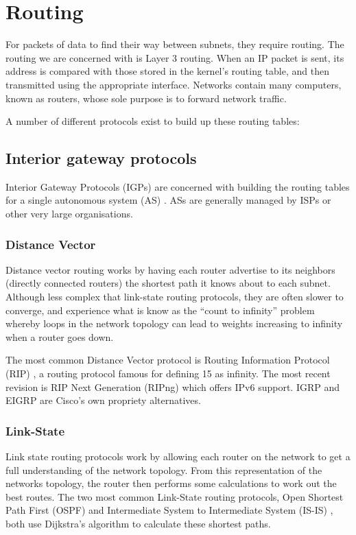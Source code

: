 \documentclass[12pt]{report}
\begin{document}
\section{Routing}
For packets of data to find their way between subnets, they require routing.
The routing we are concerned with is Layer 3 routing. When an IP packet is
sent, its address is compared with those stored in the kernel's routing table,
and then transmitted using the appropriate interface. Networks contain many
computers, known as routers,  whose sole purpose is to forward network traffic.

A number of different protocols exist to build up these routing tables:

\subsection{Interior gateway protocols}
Interior Gateway Protocols (IGPs)  are concerned with building the routing tables for a single
autonomous system (AS) . ASs are generally
managed by ISPs or other very large organisations.  

\subsubsection{Distance Vector}
Distance vector routing works by having each router advertise to its neighbors
(directly connected routers) the shortest path it knows about to each subnet.
Although less complex that link-state routing protocols, they are often slower
to converge, and experience what is know as the ``count to infinity'' problem
whereby loops in the network topology can lead to weights increasing to
infinity when a router goes down. 

The most common Distance Vector protocol is Routing Information Protocol (RIP)
, a routing protocol famous for
defining 15 as infinity. The most recent revision is RIP Next Generation
(RIPng) which offers IPv6 support. IGRP and EIGRP are Cisco's own propriety
alternatives.

\subsubsection{Link-State}
Link state routing protocols work by allowing each router on the network to get
a full understanding of the network topology. From this representation of the
networks topology, the router then performs some calculations to work out the
best routes. The two most common Link-State routing protocols, Open Shortest
Path First (OSPF)  and
Intermediate System to Intermediate System (IS-IS)
, both use
Dijkstra's algorithm to calculate these shortest paths. 
\end{document}
